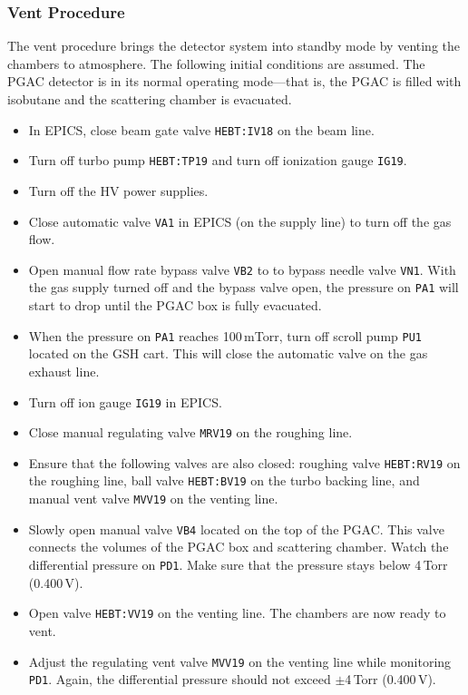 \subsubsection{Vent Procedure}
The vent procedure brings the detector system into standby mode by venting the chambers to atmosphere. The following initial conditions are assumed. The PGAC detector is in its normal operating mode---that is, the PGAC is filled with isobutane and the scattering chamber is evacuated. %
\begin{itemize}
\setlength{\itemsep}{0pt}
\setlength{\parskip}{0pt}
\setlength{\parsep}{0pt}
\item In EPICS, close beam gate valve \texttt{HEBT:IV18} on the beam line.
\item Turn off turbo pump \texttt{HEBT:TP19}  and turn off ionization gauge \texttt{IG19}.
\item Turn off the HV power supplies.
\item Close automatic valve \texttt{VA1} in EPICS (on the supply line) to turn off the gas flow.
\item Open manual flow rate bypass valve \texttt{VB2} to to bypass needle valve \texttt{VN1}. With the gas supply turned off and the bypass valve open, the pressure on \texttt{PA1} will start to drop until the PGAC box is fully evacuated. 
\item When the pressure on \texttt{PA1} reaches 100\,mTorr, turn off scroll pump \texttt{PU1} located on the GSH cart. This will close the automatic valve on the gas exhaust line.
\item Turn off ion gauge \texttt{IG19} in EPICS.
\item Close manual regulating valve \texttt{MRV19} on the roughing line. 
\item Ensure that the following valves are also closed: roughing valve \texttt{HEBT:RV19} on the roughing line, ball valve \texttt{HEBT:BV19} on the turbo backing line, and manual vent valve \texttt{MVV19} on the venting line.

\item Slowly open manual valve \texttt{VB4} located on the top of the PGAC.  This valve connects the volumes of the PGAC box and scattering chamber. Watch the differential pressure on \texttt{PD1}.  Make sure that the pressure stays below 4\,Torr (0.400\,V).
\item Open valve \texttt{HEBT:VV19} on the venting line. The chambers are now ready to vent.
\item Adjust the regulating vent valve \texttt{MVV19} on the venting line while monitoring \texttt{PD1}.  Again, the differential pressure should not exceed $\pm$4\,Torr (0.400\,V).

\end{itemize}
